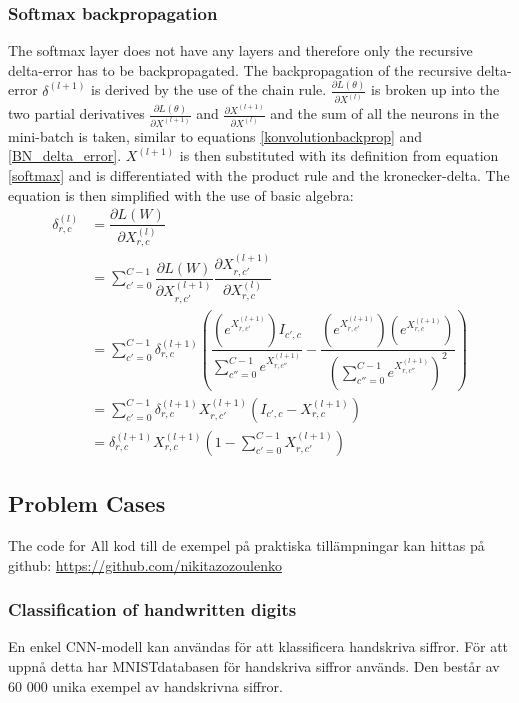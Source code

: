 \documentclass[a4paper,11pt,twoside]{article}
\newcommand*{\pd}[2]{\ensuremath{\dfrac{\partial #1}{\partial #2}}}
\newcommand*{\inpd}[2]{\ensuremath{\frac{\partial #1}{\partial #2}}}
\begin{document}
\subsubsection{Softmax backpropagation}
The softmax layer does not have any layers and therefore only the recursive delta-error has to be backpropagated. The backpropagation of the recursive delta-error $\delta^{(l+1)}$ is derived by the use of the chain rule. $\inpd{L(\theta)}{X^{(l)}}$ is broken up into the two partial derivatives $\inpd{L(\theta)}{X^{(l+1)}}$ and $\inpd{X^{(l+1)}}{X^{(l)}}$ and the sum of all the neurons in the mini-batch is taken, similar to equations \eqref{konvolutionbackprop} and \eqref{BN_delta_error}. $X^{(l+1)}$ is then substituted with its definition from equation \eqref{softmax} and is differentiated with the product rule and the kronecker-delta. The equation is then simplified with the use of basic algebra: \cite{cs231n} \cite{notesonbackprop} \cite{websoftmax} 
\begin{equation}
\begin{split}
\delta^{(l)}_{r,c}
		& = \pd{L(W)}{X^{(l)}_{r,c}} \\
		& = \sum^{C-1}_{c'=0} \pd{L(W)}{X^{(l+1)}_{r,c'}} \pd{X^{(l+1)}_{r,c'}}{X^{(l)}_{r,c}} \\
		& = \sum^{C-1}_{c'=0} \delta^{(l+1)}_{r,c} \left(  \dfrac{(e^{X^{(l+1)}_{r,c'}})I_{c',c}}{\sum^{C-1}_{c''=0}e^{X^{(l+1)}_{r,c''}}} - \dfrac{(e^{X^{(l+1)}_{r,c'}})(e^{X^{(l+1)}_{r,c}})}{(\sum^{C-1}_{c''=0}e^{X^{(l+1)}_{r,c''}})^2} \right) \\
		& = \sum^{C-1}_{c'=0}  \delta^{(l+1)}_{r,c} X^{(l+1)}_{r,c'}(I_{c',c}-X^{(l+1)}_{r,c}) \\
		& = \delta^{(l+1)}_{r,c} X^{(l+1)}_{r,c} \left( 1-\sum^{C-1}_{c'=0} X^{(l+1)}_{r,c'} \right)
\end{split}
\end{equation}

\subsection{Problem Cases}
The code for 
All kod till de exempel på praktiska tillämpningar kan hittas på github: \url{https://github.com/nikitazozoulenko}
\subsubsection{Classification of handwritten digits}
En enkel CNN-modell kan användas för att klassificera handskriva siffror. För att uppnå detta har MNISTdatabasen för handskriva siffror används. Den består av 60 000 unika exempel av handskrivna siffror. \cite{MNIST}
\end{document}
